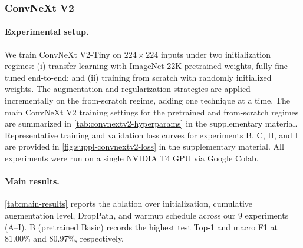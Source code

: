 \subsubsection{ConvNeXt V2}
\label{sec:dl-convnextv2}

\paragraph{Experimental setup.}
We train ConvNeXt V2-Tiny on $224\times224$ inputs under two initialization regimes: (i) transfer learning with ImageNet-22K-pretrained weights, fully fine-tuned end-to-end; and (ii) training from scratch with randomly initialized weights. The augmentation and regularization strategies are applied incrementally on the from-scratch regime, adding one technique at a time. The main ConvNeXt V2 training settings for the pretrained and from-scratch regimes are summarized in \cref{tab:convnextv2-hyperparams} in the supplementary material. Representative training and validation loss curves for experiments B, C, H, and I are provided in \cref{fig:suppl-convnextv2-loss} in the supplementary material. All experiments were run on a single NVIDIA T4 GPU via Google Colab.

\paragraph{Main results.}
\cref{tab:main-results} reports the ablation over initialization, cumulative augmentation level, DropPath, and warmup schedule across our $9$ experiments (A--I). B (pretrained Basic) records the highest test Top-1 and macro F1 at $81.00\%$ and $80.97\%$, respectively.

